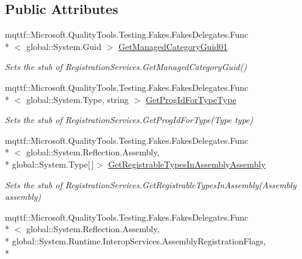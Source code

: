 \subsection*{Public Attributes}
\begin{DoxyCompactItemize}
\item 
mqttf\-::\-Microsoft.\-Quality\-Tools.\-Testing.\-Fakes.\-Fakes\-Delegates.\-Func\\*
$<$ global\-::\-System.\-Guid $>$ \hyperlink{class_system_1_1_runtime_1_1_interop_services_1_1_fakes_1_1_stub_registration_services_a6a0381fc66b8b52374e14ce9e29936d4}{Get\-Managed\-Category\-Guid01}
\begin{DoxyCompactList}\small\item\em Sets the stub of Registration\-Services.\-Get\-Managed\-Category\-Guid()\end{DoxyCompactList}\item 
mqttf\-::\-Microsoft.\-Quality\-Tools.\-Testing.\-Fakes.\-Fakes\-Delegates.\-Func\\*
$<$ global\-::\-System.\-Type, string $>$ \hyperlink{class_system_1_1_runtime_1_1_interop_services_1_1_fakes_1_1_stub_registration_services_a3c3a7d38b2fa61346855315674ba1048}{Get\-Prog\-Id\-For\-Type\-Type}
\begin{DoxyCompactList}\small\item\em Sets the stub of Registration\-Services.\-Get\-Prog\-Id\-For\-Type(\-Type type)\end{DoxyCompactList}\item 
mqttf\-::\-Microsoft.\-Quality\-Tools.\-Testing.\-Fakes.\-Fakes\-Delegates.\-Func\\*
$<$ global\-::\-System.\-Reflection.\-Assembly, \\*
global\-::\-System.\-Type\mbox{[}$\,$\mbox{]}$>$ \hyperlink{class_system_1_1_runtime_1_1_interop_services_1_1_fakes_1_1_stub_registration_services_a4603927cc109ed31e6410d35639e1624}{Get\-Registrable\-Types\-In\-Assembly\-Assembly}
\begin{DoxyCompactList}\small\item\em Sets the stub of Registration\-Services.\-Get\-Registrable\-Types\-In\-Assembly(\-Assembly assembly)\end{DoxyCompactList}\item 
mqttf\-::\-Microsoft.\-Quality\-Tools.\-Testing.\-Fakes.\-Fakes\-Delegates.\-Func\\*
$<$ global\-::\-System.\-Reflection.\-Assembly, \\*
global\-::\-System.\-Runtime.\-Interop\-Services.\-Assembly\-Registration\-Flags, \\*

\end{DoxyCompactItemize}
